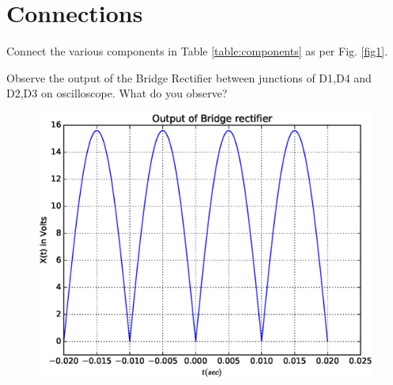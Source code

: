 \documentclass[journal,12pt,twocolumn]{IEEEtran}
\begin{document}
\section{Connections}
\begin{problem}
Connect the various components in Table \ref{table:components} as per Fig. \ref{fig1}.
\end{problem}
\begin{problem}
Observe the output of the Bridge Rectifier between junctions of D1,D4 and D2,D3 on  oscilloscope. What do you observe?
\end{problem}
\solution
\begin{figure}[h]
\centering
	\includegraphics[scale=0.4]{./figs/sine.eps}
	\caption{}  \label{fig2}
    \end{figure}
\end{document}
